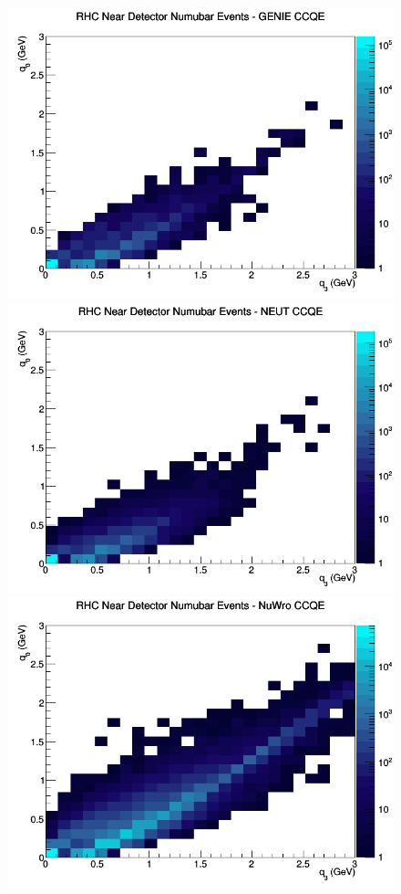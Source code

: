 \documentclass[12pt]{article}
\begin{document}
\begin{figure}[h]
\centering
{}
\includegraphics[width=\linewidth]{eff_q0_q3/FGT/CCQE_RHC_ND_numubar_q3_q0_GENIE.png}
\endminipage
{}
\includegraphics[width=\linewidth]{eff_q0_q3/FGT/CCQE_RHC_ND_numubar_q3_q0_NEUT.png}
\endminipage
{}
\includegraphics[width=\linewidth]{eff_q0_q3/FGT/CCQE_RHC_ND_numubar_q3_q0_NuWro.png}

\end{figure}
\end{document}
